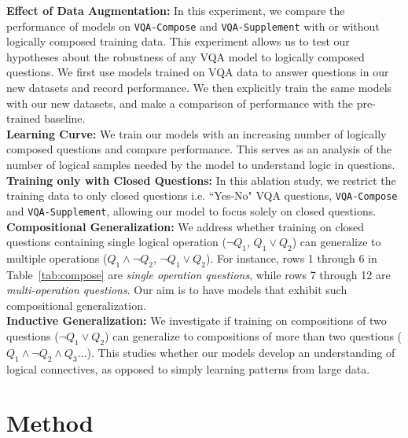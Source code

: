         \noindent\textbf{Effect of Data Augmentation:}
        In this experiment, we compare the performance of models on \texttt{VQA-Compose} and \texttt{VQA-Supplement} with or without logically composed training data.
        This experiment allows us to test our hypotheses about the robustness of any VQA model to logically composed questions.
        We first use models trained on VQA data to answer questions in our new datasets and record performance.
        We then explicitly train the same models with our new datasets, and make a comparison of performance with the pre-trained baseline.\\
        
        \noindent\textbf{Learning Curve:}
        We train our models with an increasing number of logically composed questions and compare performance.
        This serves as an analysis of the number of logical samples needed by the model to understand logic in questions.\\
    
        \noindent\textbf{Training only with Closed Questions:}
        In this ablation study, we restrict the training data to only closed questions i.e. ``Yes-No" VQA questions, \texttt{VQA-Compose} and \texttt{VQA-Supplement}, allowing our model to focus solely on closed questions.\\
    
        \noindent\textbf{Compositional Generalization:}
        We address whether training on closed questions containing single logical operation ($\neg Q_1$,  $Q_1\vee Q_2$) can generalize to multiple operations ($Q_1 \wedge \neg Q_2$, $\neg Q_1 \vee Q_2$).
        For instance, rows 1 through 6 in Table~\ref{tab:compose} are {\it single operation questions}, while rows 7 through 12 are {\it multi-operation questions}.
        Our aim is to have models that exhibit such compositional generalization.\\
        
        \noindent\textbf{Inductive Generalization:}
        We investigate if training on compositions of two questions ($\neg Q_1 \vee Q_2$) can generalize to compositions of more than two questions ($Q_1 \wedge \neg Q_2 \wedge Q_3 \dots$).
        This studies whether our models develop an understanding of logical connectives, as opposed to simply learning patterns from large data.

\section{Method}



